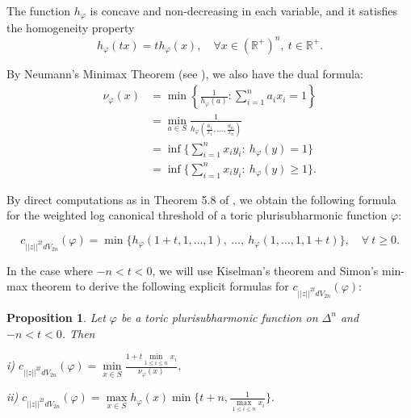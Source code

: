 \documentclass[a4paper,oneside,reqno,11pt]{article}
\newtheorem{proposition}[theorem]{Proposition}
\def\n{\noindent}
\def\n{\noindent}
\begin{document}
The function $h_\varphi$ is concave and non-decreasing in each variable, and it satisfies the homogeneity property
$$
h_{\varphi}(t x) = t h_{\varphi}(x), \quad \forall x \in (\mathbb{R}^+)^n, \ t \in \mathbb{R}^+.
$$

By Neumann's Minimax Theorem (see \cite{Ne28}), we also have the dual formula:
$$
\begin{aligned}
\nu_{\varphi}(x) &= \min \left\{ \frac{1}{h_\varphi(a)} : \sum_{i=1}^n a_i x_i = 1 \right\} \\
&= \min_{a \in S} \frac{1}{h_\varphi\left( \frac{a_1}{x_1}, \ldots, \frac{a_n}{x_n} \right)}\\
&= \inf \{ \sum\limits_{i=1}^n x_i y_i: \  h_{\varphi} ( y ) = 1\}\\
&= \inf \{ \sum\limits_{i=1}^n x_i y_i: \  h_{\varphi} ( y ) \geq 1\}.
\end{aligned}
$$


By direct computations as in Theorem 5.8 of \cite{Ki94}, we obtain the following formula for the weighted log canonical threshold of a toric plurisubharmonic function $\varphi$:

\begin{equation}\label{eq:toric_lct_positive}
	c_{ ||z||^{ 2t } dV_{ 2n } } ( \varphi ) = \min \big\{ h_{ \varphi } ( 1 + t,1,\ldots,1 ),\ \ldots,\ h_{ \varphi } ( 1,\ldots,1,1 + t ) \big\},\quad \forall\ t \geq 0.
\end{equation}

In the case where $-n < t < 0$, we will use Kiselman's theorem and Simon's min-max theorem to derive the following explicit formulas for $c_{ ||z||^{ 2t } dV_{ 2n } } ( \varphi )$:

\begin{proposition}\label{toric_formula1} Let $\varphi$ be a toric plurisubharmonic function on $\Delta^n$ and $-n < t < 0$. Then 

\n
i) $c_{ ||z||^{ 2t } dV_{ 2n } } ( \varphi ) = \min\limits_{ x\in S } \frac { 1 + t \min\limits_{ 1\leq i \leq n } x_i } { \nu_{ \varphi } ( x ) },$

\n
ii) $c_{ ||z||^{ 2t } dV_{ 2n } } ( \varphi ) = \max\limits_{ x\in S } h_{ \varphi }  ( x ) \min \{ t+n , \frac { 1 } { \max\limits_{1\leq i \leq n} x_i }  \}.$
\end{proposition}
\end{document}
